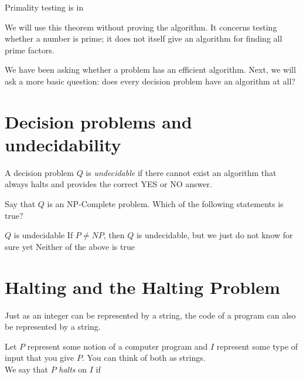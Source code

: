 \documentclass[11  pt]{article}
\begin{document}
\begin{theorem}
    Primality testing is in 
\end{theorem}
We will use this theorem without proving the algorithm. It concerns testing whether a number is prime; it does not itself give an algorithm for finding all prime factors.

\vfill
We have been asking whether a problem has an efficient algorithm. Next, we will ask a more basic question: does every decision problem have an algorithm at all?

\newpage
    \section{Decision problems and undecidability}
    A decision problem $Q$ is \emph{undecidable} if there cannot exist an algorithm that always halts and provides the correct YES or NO answer.

    \begin{Qu}
        Say that $Q$ is an NP-Complete problem. Which of the following statements is true?
        \begin{itemize}
            \aitem $Q$ is undecidable
            \bitem If $P \neq NP$, then $Q$ is undecidable, but we just do not know for sure yet
            \citem Neither of the above is true
        \end{itemize}
    \end{Qu}


\newpage

\section{Halting and the Halting Problem}
Just as an integer can be represented by a string, the code of a program can also be represented by a string.

Let $P$ represent some notion of a computer program and $I$ represent some type of input that you give $P$. You can think of both as strings.\\

We say that $P$ \emph{halts} on $I$ if
\vs{2cm}
\end{document}
